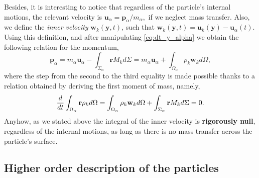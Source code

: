 Besides, it is interesting to notice that regardless of the particle's internal motions, the relevant velocity is $\textbf{u}_\alpha = \textbf{p}_\alpha /m_\alpha,$ if we neglect mass transfer.
Also, we define the \textit{inner velocity} $\textbf{w}_k(\textbf{y},t)$, such that $\textbf{w}_k(\textbf{y},t) = \textbf{u}_k(\textbf{y}) - \textbf{u}_\alpha(t)$.
Using this definition, and after manipulating \ref{eq:dt_y_alpha} we obtain the following relation for the momentum,
\begin{equation}
    \textbf{p}_\alpha
    =  m_\alpha \textbf{u}_\alpha
    - \int_{\Sigma_\alpha} \textbf{r} M_k d\Sigma
    = m_\alpha \textbf{u}_\alpha
    + \int_{\Omega_\alpha} \rho_k \textbf{w}_k d\Omega,
    \label{eq:velocity_definition}
\end{equation}
where the step from the second to the third equality is made possible thanks to a relation obtained by deriving the first moment of mass, namely, 
\begin{equation}
    \label{eq:M_alpha_dt}
    \frac{d}{d t} \int_{\Omega_\alpha} \textbf{r} \rho_k d\Omega
    = \int_{\Omega_\alpha} \rho_k  \textbf{w}_k  d\Omega
    + \int_{\Sigma_\alpha} \textbf{r} M_k  d\Sigma = 0.
\end{equation}
Anyhow, as we stated above the integral of the inner velocity is \textbf{rigorously null}, regardless of the internal motions, as long as there is no mass transfer across the  particle's surface.


\subsection{Higher order description of the particles}

